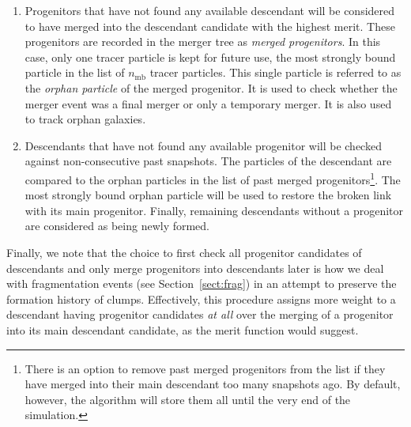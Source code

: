 \begin{enumerate}

\item Progenitors that have not found any available descendant will be
  considered to have merged into the descendant candidate with the highest merit. These progenitors are recorded in the merger tree as
  \emph{merged progenitors}.  In this case, only one tracer particle is
  kept for future use, the most strongly bound particle in the list of $n_{\mathrm{mb}}$ tracer
particles.  This single particle is referred to as the
  \emph{orphan particle} of the merged progenitor.  It is used to
  check whether the merger event was a final merger or only a
  temporary merger. It is also used to track orphan galaxies.

\item Descendants that have not found any available progenitor will be
  checked against non-consecutive past snapshots. The particles of the
  descendant are compared to the orphan particles in the list of past
  merged progenitors\footnote{There is an option to remove past merged
  progenitors from the list if they have merged into their main
  descendant too many snapshots ago.  By default, however, the
  algorithm will store them all until the very end of the
  simulation.}.  The most strongly bound orphan particle will be used
  to restore the broken link with its main progenitor.  Finally,
  remaining descendants without a progenitor are considered as being
  newly formed.

\end{enumerate}

Finally, we note that the choice to first check all progenitor candidates of descendants and only
merge progenitors into descendants later is how we deal with fragmentation
events (see Section~\ref{sect:frag}) in an attempt to preserve the formation
history of clumps. Effectively, this procedure assigns more weight to a
descendant having progenitor candidates \textit{at all} over the merging of a progenitor into its main descendant candidate, as the merit function would suggest.

